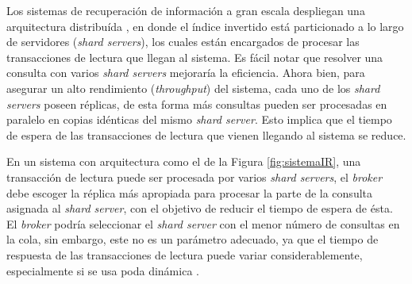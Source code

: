Los sistemas de recuperación de información a gran escala despliegan una arquitectura distribuída \citep{Dean:2009}, en donde el índice invertido está particionado \citep{Barroso:2003} a lo largo de servidores (\textit{shard servers}), los cuales están encargados de procesar las transacciones de lectura que llegan al sistema. Es fácil notar que resolver una consulta con varios \textit{shard servers} mejoraría la eficiencia. Ahora bien, para asegurar un alto rendimiento (\textit{throughput}) del sistema, cada uno de los \textit{shard servers} poseen réplicas, de esta forma más consultas pueden ser procesadas en paralelo en copias idénticas del mismo \textit{shard server}. Esto implica que el tiempo de espera de las transacciones de lectura que vienen llegando al sistema se reduce. 

En un sistema con arquitectura como el de la Figura \ref{fig:sistemaIR}, una transacción de lectura puede ser procesada por varios \textit{shard servers}, el \textit{broker} debe escoger la réplica más apropiada para procesar la parte de la consulta asignada al \textit{shard server}, con el objetivo de reducir el tiempo de espera de ésta. El \textit{broker} podría seleccionar el \textit{shard server} con el menor número de consultas en la cola, sin embargo, este no es un parámetro adecuado, ya que el tiempo de respuesta de las transacciones de lectura puede variar considerablemente, especialmente si se usa poda dinámica \citep{Broder:2003, Moffat:1996}. 

